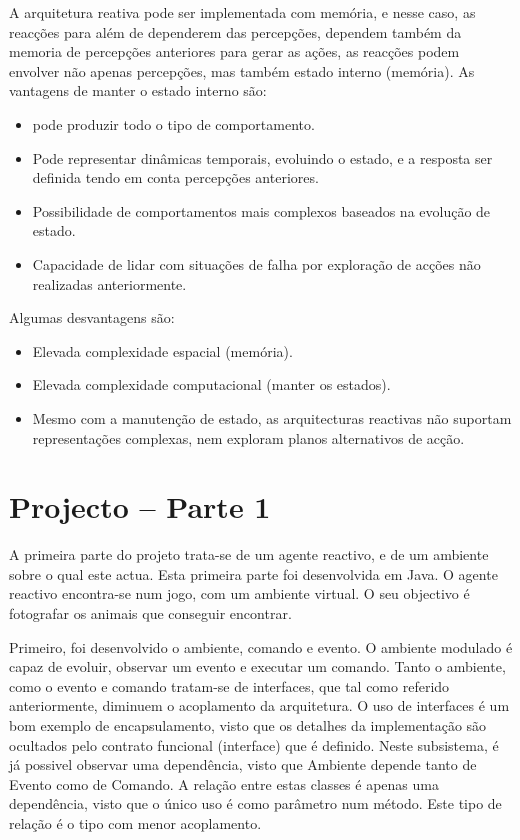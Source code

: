 \documentclass[a4paper,12pt]{article}
\begin{document}
A arquitetura reativa pode ser implementada com memória, e nesse caso, as reacções para além de dependerem das percepções, dependem também da memoria de percepções anteriores para gerar as ações, as reacções podem envolver não apenas percepções, mas também estado interno (memória). As vantagens de manter o estado interno são:
\begin{itemize}
	\item pode produzir todo o tipo de comportamento.
	\item Pode representar dinâmicas temporais, evoluindo o estado, e a resposta ser definida tendo em conta percepções anteriores.
	\item Possibilidade de comportamentos mais complexos baseados na evolução de estado.
	\item Capacidade de lidar com situações de falha por exploração de acções não realizadas anteriormente.
\end{itemize}

Algumas desvantagens são:
\begin{itemize}
	\item Elevada complexidade espacial (memória).
	\item Elevada complexidade computacional (manter os estados).
	\item Mesmo com a manutenção de estado, as arquitecturas reactivas não suportam representações complexas, nem exploram planos alternativos de acção.
\end{itemize}
	
\newpage
\section{Projecto – Parte 1}
A primeira parte do projeto trata-se de um agente reactivo, e de um ambiente sobre o qual este actua. Esta primeira parte foi desenvolvida em Java.
O agente reactivo encontra-se num jogo, com um ambiente virtual. O seu objectivo é fotografar os animais que conseguir encontrar.

Primeiro, foi desenvolvido o ambiente, comando e evento. O ambiente modulado é capaz de evoluir, observar um evento e executar um comando.
Tanto o ambiente, como o evento e comando tratam-se de interfaces, que tal como referido anteriormente, diminuem o acoplamento da arquitetura. O uso de interfaces é um bom exemplo de encapsulamento, visto que os detalhes da implementação são ocultados pelo contrato funcional (interface) que é definido.
Neste subsistema, é já possivel observar uma dependência, visto que Ambiente depende tanto de Evento como de Comando. A relação entre estas classes é apenas uma dependência, visto que o único uso é como parâmetro num método. Este tipo de relação é o tipo com menor acoplamento.
\end{document}
